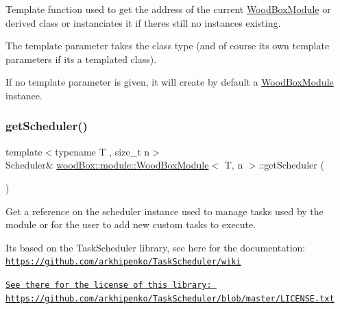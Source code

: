 Template function used to get the address of the current \mbox{\hyperlink{classwood_box_1_1module_1_1_wood_box_module}{Wood\+Box\+Module}} or derived class or instanciates it if there\textquotesingle{}s still no instances existing.

The template parameter takes the class type (and of course it\textquotesingle{}s own template parameters if it\textquotesingle{}s a templated class).

If no template parameter is given, it will create by default a \mbox{\hyperlink{classwood_box_1_1module_1_1_wood_box_module}{Wood\+Box\+Module}} instance. \mbox{\label{classwood_box_1_1module_1_1_wood_box_module_a24b14dd95e7b1c5a7ba31107cd0c524d}} 
\subsubsection{\texorpdfstring{get\+Scheduler()}{getScheduler()}}
{\footnotesize\ttfamily template$<$typename T , size\+\_\+t n$>$ \\
Scheduler\& \mbox{\hyperlink{classwood_box_1_1module_1_1_wood_box_module}{wood\+Box\+::module\+::\+Wood\+Box\+Module}}$<$ T, n $>$\+::get\+Scheduler (\begin{DoxyParamCaption}{ }\end{DoxyParamCaption})\hspace{0.3cm}{\ttfamily [inline]}}

Get a reference on the scheduler instance used to manage tasks used by the module or for the user to add new custom tasks to execute.

It\textquotesingle{}s based on the Task\+Scheduler library, see here for the documentation\+: \href{https://github.com/arkhipenko/TaskScheduler/wiki}{\tt https\+://github.\+com/arkhipenko/\+Task\+Scheduler/wiki}

\href{https://github.com/arkhipenko/TaskScheduler/blob/master/LICENSE.txt}{\tt See there for the license of this library\+: https\+://github.\+com/arkhipenko/\+Task\+Scheduler/blob/master/\+L\+I\+C\+E\+N\+S\+E.\+txt} \mbox{\label{classwood_box_1_1module_1_1_wood_box_module_a4d5b8fd2ec5aeacb5704435bb6d961e7}} 
